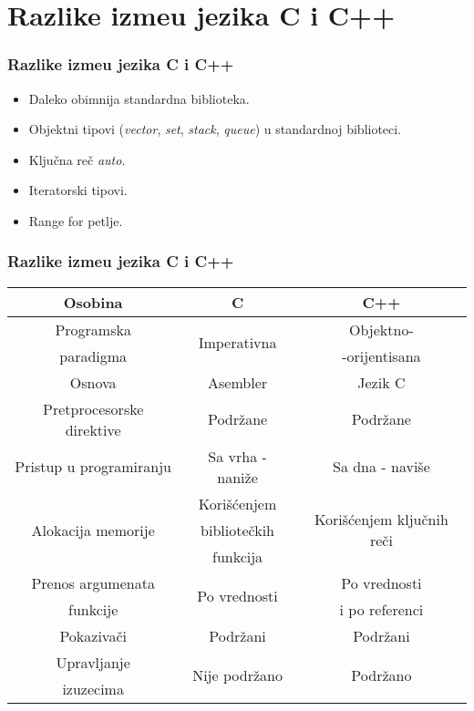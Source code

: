 \documentclass{beamer}
\def\d{{\fontencoding{T1}\selectfont\dj}}
\begin{document}
\section{Razlike izme\d u jezika C i C++}

\begin{frame}[fragile]\frametitle{Razlike izme\d u jezika C i C++}
    \begin{itemize}
	    \item Daleko obimnija standardna biblioteka.
            \item Objektni tipovi (\emph{vector}, \emph{set}, \emph{stack}, \emph{queue}) u standardnoj biblioteci.
            \item Ključna reč \emph{auto}.
            \item Iteratorski tipovi.
            \item Range for petlje.
            \end{itemize}	
\end{frame}

\begin{frame}[fragile]\frametitle{Razlike izme\d u jezika C i C++}
    \centering
    \begin{tabular}{|c|c|c|}
    \hline
    Osobina & C & C++ \\
    \hline
    Programska & \multirow{2}{5.5em}{Imperativna} & Objektno- \\
    paradigma & & -orijentisana\\
    \hline
    Osnova & Asembler & Jezik C \\
    \hline
    Pretprocesorske direktive & Podržane & Podržane\\
    \hline
    Pristup u programiranju & Sa vrha - naniže & Sa dna - naviše\\
    \hline
    \multirow{3}{4em}{Alokacija memorije} & Korišćenjem  & \multirow{3}{5.5em}{Korišćenjem ključnih reči}\\
    & bibliotečkih & \\
    & funkcija &\\
    \hline
    Prenos argumenata & \multirow{2}{5.5em}{Po vrednosti} & Po vrednosti\\
    funkcije & & i po referenci\\
    \hline
    Pokazivači & Podržani & Podržani\\
    \hline
    Upravljanje & \multirow{2}{6.2em}{Nije podržano} & \multirow{2}{4em}{Podržano} \\
    izuzecima & &\\
    \hline
    \end{tabular}
\end{frame}
\end{document}
